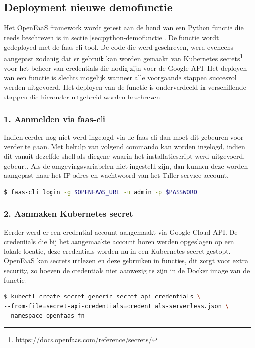 \subsection{Deployment nieuwe demofunctie}
Het OpenFaaS framework wordt getest aan de hand van een Python functie die reeds beschreven is in sectie \ref{sec:python-demofunctie}. De functie wordt gedeployed met de faas-cli tool. De code die werd geschreven, werd eveneens aangepast zodanig dat er gebruik kan worden gemaakt van Kubernetes secrets\footnote{https://docs.openfaas.com/reference/secrets/} voor het beheer van credentials die nodig zijn voor de Google API. Het deployen van een functie is slechts mogelijk wanneer alle voorgaande stappen succesvol werden uitgevoerd. Het deployen van de functie is onderverdeeld in verschillende stappen die hieronder uitgebreid worden beschreven. 

\subsubsection{1. Aanmelden via faas-cli}
Indien eerder nog niet werd ingelogd via de faas-cli dan moet dit gebeuren voor verder te gaan. Met behulp van volgend commando kan worden ingelogd, indien dit vanuit dezelfde shell als diegene waarin het installatiescript werd uitgevoerd, gebeurt. Als de omgevingsvariabelen niet ingesteld zijn, dan kunnen deze worden aangepast naar het IP adres en wachtwoord van het Tiller service account.
\begin{lstlisting}[language=bash]
$ faas-cli login -g $OPENFAAS_URL -u admin -p $PASSWORD
\end{lstlisting}

\subsubsection{2. Aanmaken Kubernetes secret}
Eerder werd er een credential account aangemaakt via Google Cloud API. De credentials die bij het aangemaakte account horen werden opgeslagen op een lokale locatie, deze credentials worden nu in een Kubernetes secret gestopt. OpenFaaS kan secrets uitlezen en deze gebruiken in functies, dit zorgt voor extra security, zo hoeven de credentials niet aanwezig te zijn in de Docker image van de functie.

\begin{lstlisting}[language=bash]
$ kubectl create secret generic secret-api-credentials \
--from-file=secret-api-credentials=credentials-serverless.json \
--namespace openfaas-fn
\end{lstlisting}


